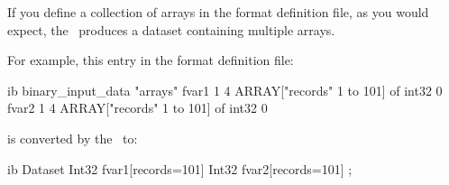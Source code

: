 If you define a collection of arrays in the format definition file, as
you would expect, the \ffs\ produces a dataset containing multiple
arrays.

For example, this entry in the format definition file:

\begin{vcode}{ib}
binary_input_data "arrays"
fvar1 1 4 ARRAY["records" 1 to 101] of int32 0
fvar2 1 4 ARRAY["records" 1 to 101] of int32 0
\end{vcode}

is converted by the \ffs\ to:

\begin{vcode}{ib}
Dataset {
  Int32 fvar1[records=101]
  Int32 fvar2[records=101]
};
\end{vcode}








